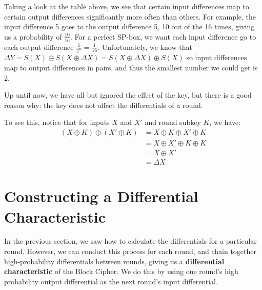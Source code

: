 Taking a look at the table above, we see that certain input differences map to
certain output differences significantly more often than others.  For example,
the input difference 5 goes to the output difference 5, 10 out of the 16 times,
giving us a probability of $\frac{10}{16}$.  For a perfect SP-box, we want each
input difference go to each output difference $\frac{1}{2^n} = \frac{1}{16}$.
Unfortunately, we know that $\Delta Y = S(X) \oplus S(X \oplus \Delta X) = S(X
\oplus \Delta X) \oplus S(X)$ so input differences map to output differences in
pairs, and thus the smallest number we could get is 2.

Up until now, we have all but ignored the effect of the key, but there is a good
reason why: the key does not affect the differentials of a round.

To see this, notice that for inputs $X$ and $X'$ and round subkey $K$, we have:
\begin{align*}
(X \oplus K) \oplus (X' \oplus K) &= X \oplus K \oplus X' \oplus K\\
&= X \oplus X' \oplus K \oplus K\\
&= X \oplus X'\\
&= \Delta X
\end{align*}

\section{Constructing a Differential Characteristic}

In the previous section, we saw how to calculate the differentials for a
particular round. However, we can conduct this process for each round, and
chain together high-probability differentials between rounds, giving us a
\textbf{differential characteristic} of the Block Cipher. We do this by using
one round's high probability output differential as the next round's input
differential.

